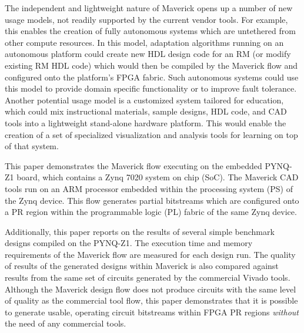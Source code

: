 The independent and lightweight nature of Maverick opens up a number of new usage models, not readily supported by the current vendor tools.
For example, this enables the creation of fully autonomous systems which are untethered from other compute resources.
In this model, adaptation algorithms running on an autonomous platform could create new HDL design code for an RM (or modify existing RM HDL code) which would then be compiled by the Maverick flow and configured onto the platform's FPGA fabric.
Such autonomous systems could use this model to provide domain specific functionality or to improve fault tolerance.
Another potential usage model is a customized system tailored for education, which could mix instructional materials, sample designs, HDL code, and CAD tools into a lightweight stand-alone hardware platform.
This would enable the creation of a set of specialized visualization and analysis tools for learning on top of that system.

This paper demonstrates the Maverick flow executing on the embedded PYNQ-Z1 board, which contains a Zynq 7020 system on chip (SoC).
The Maverick CAD tools run on an ARM processor embedded within the processing system (PS) of the Zynq device.
This flow generates partial bitstreams which are configured onto a PR region within the programmable logic (PL) fabric of the same Zynq device.

Additionally, this paper reports on the results of several simple benchmark designs compiled on the PYNQ-Z1.
The execution time and memory requirements of the Maverick flow are measured for each design run.
The quality of results of the generated designs within Maverick is also compared against results from the same set of circuits generated by the commercial Vivado tools.
Although the Maverick design flow does not produce circuits with the same level of quality as the commercial tool flow, this paper demonstrates that it is possible to generate usable, operating circuit bitstreams within FPGA PR regions {\em without} the need of any commercial tools.

